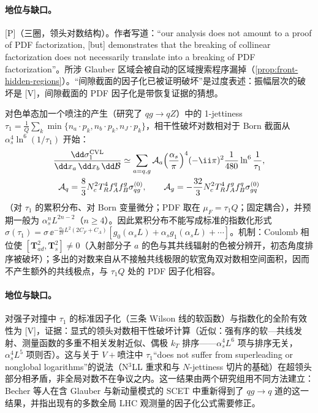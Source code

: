 \paragraph{地位与缺口。}[P]（三圈，领头对数结构）。作者写道：“our analysis does not amount to a proof of PDF factorization, [but] demonstrates that the breaking of collinear factorization does not necessarily translate into a breaking of PDF factorization”。所涉 Glauber 区域会被自动的区域搜索程序漏掉（\cref{prop:front-hidden-regions}）。“间隙截面的因子化已被证明破坏”是过度表述：振幅层次的破坏是 [V]，间隙截面的 PDF 因子化是带恢复证据的猜想。

\begin{proposition}\label{prop:front-jettiness-cvl}
对色单态加一个喷注的产生（研究了 $qg\to qZ$）中的 1-jettiness $\tau_1=\frac1Q\sum_k\min\{n_a\cdot p_k,n_b\cdot p_k,n_J\cdot p_k\}$\cite{Stewart:2010tn}，相干性破坏对数相对于 Born 截面从 $\alpha_s^4\ln^6(1/\tau_1)$ 开始：
\begin{equation}\label{eq:front-cvl}
\begin{gathered}
\frac{\dd\sigma_1^{\rm CVL}}{\dd x_a\,\dd x_b\,\dd\mathcal B}\simeq\sum_{a=q,g}\mathcal A_a\Bigl(\frac{\alpha_s}{\pi}\Bigr)^4(-\ii\pi)^2\frac{1}{480}\ln^6\frac1{\tau_1},\\
\mathcal A_q=\frac83N_c^2T_R^4f^q_Af^g_B\sigma^{(0)}_{qg},\qquad \mathcal A_g=-\frac{32}3N_c^2T_R^4f^g_Af^q_B\sigma^{(0)}_{gq}
\end{gathered}
\end{equation}
（对 $\tau_1$ 的累积分布、对 Born 变量微分；PDF 取在 $\mu_F=\tau_1Q$；固定耦合），并预期一般为 $\alpha_s^nL^{2n-2}$（$n\ge4$）。因此累积分布不能写成标准的指数化形式 $\sigma(\tau_1)=\sigma\,\ee^{-\frac{\alpha_s}{2\pi}L^2(2C_F+C_A)}[g_0(\alpha_sL)+\alpha_sg_1(\alpha_sL)+\cdots]$\cite[式~(1)--(18)]{Banfi:2025mra}。机制：Coulomb 相位使 $[\mathbf T^2_{ad},\mathbf T^2_s]\ne0$（入射部分子 $a$ 的色与其共线辐射的色被分辨开，初态角度排序被破坏）；多出的对数来自从不接触共线极限的软宽角双对数相空间面积，因而不产生额外的共线极点，与 $\tau_1Q$ 处的 PDF 因子化相容。
\end{proposition}

\paragraph{地位与缺口。}对强子对撞中 $\tau_1$ 的标准因子化（三条 Wilson 线的软函数）与指数化的全阶有效性为 [V]，证据：显式的领头对数相干性破坏计算（近似：强有序的软—共线发射、测量函数的多重不相关发射近似、偶极 $k_T$ 排序——$\alpha_s^4L^6$ 项与排序无关，$\alpha_s^4L^5$ 项则否）。这与\cite{Alioli:2023rxx}关于 $V+$喷注中 $\tau_1$“does not suffer from superleading or nonglobal logarithms”的说法（N$^3$LL 重求和与 $N$-jettiness 切片的基础）在超领头部分相矛盾，非全局对数不在争议之内。这一结果由两个研究组用不同方法建立：Becher 等人在含 Glauber 与新动量模式的 SCET 中重新得到了 $qg\to q$ 道的这一结果\cite{Becher:2026kbr}，并指出现有的多数全局 LHC 观测量的因子化公式需要修正。
